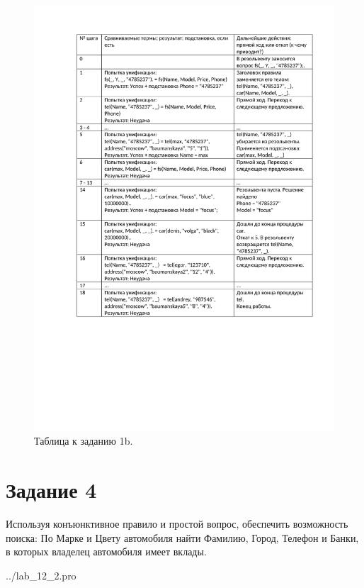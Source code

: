 \newpage
\begin{figure}[H]
	\caption{Таблица к заданию 1b.}
	\begin{center}
		\includegraphics[scale=0.85]{img/12.1b.pdf}
	\end{center}
\end{figure}

\section*{Задание 4}
Используя конъюнктивное правило и простой вопрос, обеспечить возможность поиска: По Марке и Цвету
автомобиля найти Фамилию, Город, Телефон и Банки, в которых владелец автомобиля имеет вклады.

\begin{lstinputlisting}[label=third,caption=Решение задания №4, language=lisp, firstline=0, lastline=41]{../lab_12_2.pro}
\end{lstinputlisting}

